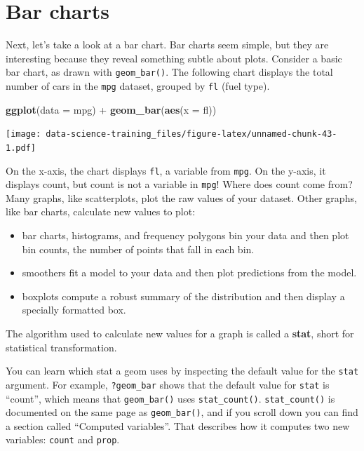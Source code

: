 \documentclass[]{book}
\newenvironment{Shaded}{\begin{snugshade}}{\end{snugshade}}
\newcommand{\KeywordTok}[1]{\textcolor[rgb]{0.13,0.29,0.53}{\textbf{{#1}}}}
\newcommand{\DataTypeTok}[1]{\textcolor[rgb]{0.13,0.29,0.53}{{#1}}}
\newcommand{\StringTok}[1]{\textcolor[rgb]{0.31,0.60,0.02}{{#1}}}
\newcommand{\NormalTok}[1]{{#1}}
\theoremstyle{definition}
\theoremstyle{definition}
\theoremstyle{definition}
\theoremstyle{remark}
\begin{document}
\section{Bar charts}\label{bar-charts}

Next, let's take a look at a bar chart. Bar charts seem simple, but they
are interesting because they reveal something subtle about plots.
Consider a basic bar chart, as drawn with \texttt{geom\_bar()}. The
following chart displays the total number of cars in the \texttt{mpg}
dataset, grouped by \texttt{fl} (fuel type).

\begin{Shaded}
\begin{Highlighting}[]
\KeywordTok{ggplot}\NormalTok{(}\DataTypeTok{data =} \NormalTok{mpg) +}\StringTok{ }
\StringTok{  }\KeywordTok{geom_bar}\NormalTok{(}\KeywordTok{aes}\NormalTok{(}\DataTypeTok{x =} \NormalTok{fl))}
\end{Highlighting}
\end{Shaded}

\texttt{[image: data-science-training\_files/figure-latex/unnamed-chunk-43-1.pdf]}

On the x-axis, the chart displays \texttt{fl}, a variable from
\texttt{mpg}. On the y-axis, it displays count, but count is not a
variable in \texttt{mpg}! Where does count come from? Many graphs, like
scatterplots, plot the raw values of your dataset. Other graphs, like
bar charts, calculate new values to plot:

\begin{itemize}
\item
  bar charts, histograms, and frequency polygons bin your data and then
  plot bin counts, the number of points that fall in each bin.
\item
  smoothers fit a model to your data and then plot predictions from the
  model.
\item
  boxplots compute a robust summary of the distribution and then display
  a specially formatted box.
\end{itemize}

The algorithm used to calculate new values for a graph is called a
\textbf{stat}, short for statistical transformation.

You can learn which stat a geom uses by inspecting the default value for
the \texttt{stat} argument. For example, \texttt{?geom\_bar} shows that
the default value for \texttt{stat} is ``count'', which means that
\texttt{geom\_bar()} uses \texttt{stat\_count()}. \texttt{stat\_count()}
is documented on the same page as \texttt{geom\_bar()}, and if you
scroll down you can find a section called ``Computed variables''. That
describes how it computes two new variables: \texttt{count} and
\texttt{prop}.
\end{document}
